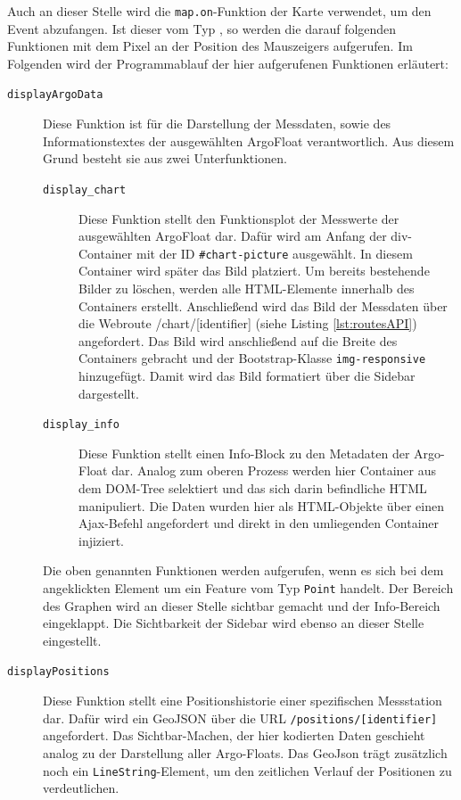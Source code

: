 Auch an dieser Stelle wird die \texttt{map.on}-Funktion der Karte verwendet, um den Event abzufangen. Ist dieser vom Typ , so werden die darauf folgenden Funktionen mit dem Pixel an der Position des Mauszeigers aufgerufen. Im Folgenden wird der Programmablauf der hier aufgerufenen Funktionen erläutert:

\begin{description}
 \item [\texttt{displayArgoData}]
    Diese Funktion ist für die Darstellung der Messdaten, sowie des Informationstextes der ausgewählten ArgoFloat verantwortlich. Aus diesem Grund besteht sie aus zwei Unterfunktionen.
    \begin{description}
    \item [\texttt{display\_chart}]
        Diese Funktion stellt den Funktionsplot der Messwerte der ausgewählten ArgoFloat dar. Dafür wird am Anfang der div-Container mit der ID \texttt{\#chart-picture} ausgewählt. In diesem Container wird später das Bild platziert. Um bereits bestehende Bilder zu löschen, werden alle HTML-Elemente innerhalb des Containers erstellt. Anschließend wird das Bild der Messdaten über die Webroute /chart/[identifier]  (siehe Listing \ref{lst:routesAPI}) angefordert. Das Bild wird anschließend auf die Breite des Containers gebracht und der Bootstrap-Klasse \texttt{img-responsive} hinzugefügt. Damit wird das Bild formatiert über die Sidebar dargestellt.
    \pagebreak
    \item [\texttt{display\_info}]
        Diese Funktion stellt einen Info-Block zu den Metadaten der Argo-Float dar. Analog zum oberen Prozess werden hier Container aus dem DOM-Tree selektiert und das sich darin befindliche  \gls{HTML} manipuliert. Die Daten wurden hier als HTML-Objekte über einen Ajax-Befehl angefordert und direkt in den umliegenden Container injiziert.
    \end{description}

    Die oben genannten Funktionen werden aufgerufen, wenn es sich bei dem angeklickten Element um ein Feature vom Typ \texttt{Point} handelt. Der Bereich des Graphen wird an dieser Stelle sichtbar gemacht und der Info-Bereich eingeklappt. Die Sichtbarkeit der Sidebar wird ebenso an dieser Stelle eingestellt.

 \item [\texttt{displayPositions}]
    Diese Funktion stellt eine Positionshistorie einer spezifischen Messstation dar. Dafür wird ein GeoJSON über die URL \texttt{/positions/[identifier]} angefordert. Das Sichtbar-Machen, der hier kodierten Daten geschieht analog zu der Darstellung aller Argo-Floats. Das GeoJson trägt zusätzlich noch ein \texttt{LineString}-Element, um den zeitlichen Verlauf der Positionen zu verdeutlichen.
\end{description}





